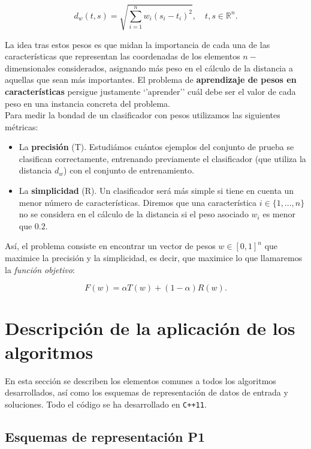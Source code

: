 \documentclass[12pt]{article}
\begin{document}
\[
    d_w(t, s) = \sqrt{\sum_{i=1}^n w_i (s_i - t_i)^2}, \quad t, s \in \mathbb{R}^n.
\]
\vspace{.5em}

La idea tras estos pesos es que midan la importancia de cada una de las características que representan las coordenadas de los elementos $n-$dimensionales considerados, asignando más peso en el cálculo de la distancia a aquellas que sean más importantes. El problema de \textbf{aprendizaje de pesos en características} persigue justamente `'aprender'' cuál debe ser el valor de cada peso en una instancia concreta del problema.\\

Para medir la bondad de un clasificador con pesos utilizamos las siguientes métricas:

\begin{itemize}
	\item La \textbf{precisión} (T). Estudiámos cuántos ejemplos del conjunto de prueba se clasifican correctamente, entrenando previamente el clasificador (que utiliza la distancia $d_w$) con el conjunto de entrenamiento.
	\item La \textbf{simplicidad} (R). Un clasificador será más simple si tiene en cuenta un menor número de características. Diremos que una característica $i \in \{1, \dots, n\}$ no se considera en el cálculo de la distancia si el peso asociado $w_i$ es menor que $0.2$. 
\end{itemize}

Así, el problema consiste en encontrar un vector de pesos $w \in [0,1]^n$ que maximice la precisión y la simplicidad, es decir, que maximice lo que llamaremos la \textit{función objetivo}:

\[
    F(w) = \alpha T(w) + (1 - \alpha) R(w).
\]

\newpage

\section{Descripción de la aplicación de los algoritmos}

En esta sección se describen los elementos comunes a todos los algoritmos desarrollados, así como los esquemas de representación de datos de entrada y soluciones. Todo el código se ha desarrollado en \verb|C++11|.


\subsection*{{\color{red}Esquemas de representación P1}}
\end{document}
